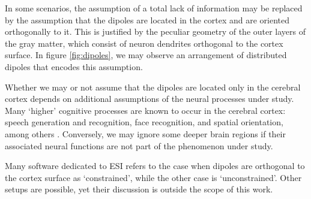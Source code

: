 In some scenarios, the assumption of a total lack of information may be replaced by the assumption that the dipoles are located in the cortex and are oriented orthogonally to it.
%
This is justified by the peculiar geometry of the outer layers of the gray matter, which consist of neuron dendrites orthogonal to the cortex surface.
%
In figure \ref{fig:dipoles}, we may observe an arrangement of distributed dipoles that encodes this assumption.

Whether we may or not assume that the dipoles are located only in the cerebral cortex depends on additional assumptions of the neural processes under study.
%
Many `higher' cognitive processes are known to occur in the cerebral cortex: speech generation and recognition, face recognition, and spatial orientation, among others \cite{Saladin_Gan_2020}.
%
Conversely, we may ignore some deeper brain regions if their associated neural functions are not part of the phenomenon under study.

Many software dedicated to ESI refers to the case when dipoles are orthogonal to the cortex surface as `constrained', while the other case is `unconstrained'. 
%
Other setups are possible, yet their discussion is outside the scope of this work.

